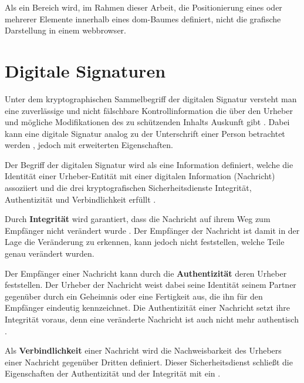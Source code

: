 Als ein Bereich wird, im Rahmen dieser Arbeit, die Positionierung eines oder mehrerer Elemente innerhalb eines \gls{dom}-Baumes definiert, nicht die grafische
Darstellung in einem \gls{webbrowser}.

\section{Digitale Signaturen}
\label{sec:GrundlagenDefinitionen:DigitaleSignaturen}
Unter dem kryptographischen Sammelbegriff der digitalen Signatur versteht man eine zuverlässige und nicht fälschbare Kontrollinformation die über den Urheber
und mögliche Modifikationen des zu schützenden Inhalts Auskunft gibt \cite{kits}. Dabei kann eine digitale Signatur analog zu der Unterschrift einer Person
betrachtet werden \cite{esig:bsi}, jedoch mit erweiterten Eigenschaften.

Der Begriff der digitalen Signatur wird als eine Information definiert, welche die Identität einer Urheber-Entität mit einer digitalen Information (Nachricht)
assoziiert und die drei kryptografischen Sicherheitsdienste Integrität, Authentizität und Verbindlichkeit erfüllt \cite{hac}.

\label{sec:GrundlagenDefinitionen:DigitaleSignaturen:Integrität}
Durch \textbf{Integrität} wird garantiert, dass die Nachricht auf ihrem Weg zum Empfänger nicht verändert wurde \cite{niag}. Der Empfänger der Nachricht ist
damit in der Lage die Veränderung zu erkennen, kann jedoch nicht feststellen, welche Teile genau verändert wurden.

\label{sec:GrundlagenDefinitionen:DigitaleSignaturen:Authentizität}
Der Empfänger einer Nachricht kann durch die \textbf{Authentizität} deren Urheber feststellen. Der Urheber der Nachricht weist dabei seine Identität seinem
Partner gegenüber durch ein Geheimnis oder eine Fertigkeit aus, die ihn für den Empfänger eindeutig kennzeichnet. Die Authentizität einer Nachricht setzt ihre
Integrität voraus, denn eine veränderte Nachricht ist auch nicht mehr authentisch \cite{kits}.

\label{sec:GrundlagenDefinitionen:DigitaleSignaturen:Verbindlichkeit}
Als \textbf{Verbindlichkeit} einer Nachricht wird die Nachweisbarkeit des Urhebers einer Nachricht gegenüber Dritten definiert. Dieser Sicherheitsdienst schließt die
Eigenschaften der Authentizität und der Integrität mit ein \cite{kits}.

